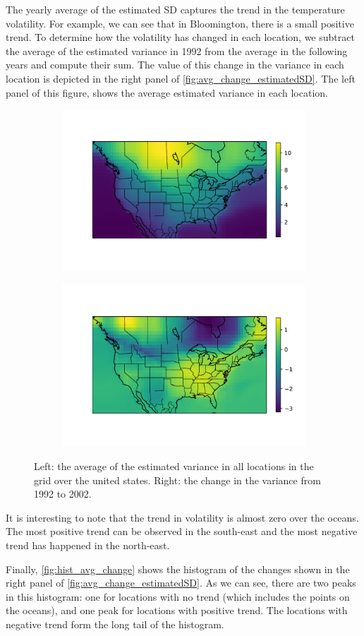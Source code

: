 \documentclass{article}
\begin{document}
The yearly average of the estimated SD captures the trend in the temperature volatility. For example, we can see that in Bloomington, there is a small positive trend. To determine how the volatility has changed in each location, we subtract the average of the estimated variance in 1992 from the average in the following years and compute their sum. The value of this change in the variance in each location is depicted in the right panel of \autoref{fig:avg_change_estimatedSD}. The left panel of this figure, shows the average estimated variance in each location.

\begin{figure}[ht]
	\begin{subfigure}
	  \centering
	  \includegraphics[width=.5\linewidth]{Figures/avg_estimatedVar}
	\end{subfigure}%
	\begin{subfigure}
	  \centering
	  \includegraphics[width=.5\linewidth]{Figures/avg_change_estimatedVar}
	\end{subfigure}%
	\caption{Left: the average of the estimated variance in all locations in the grid over the united states. Right: the change in the variance from 1992 to 2002.}
	\label{fig:avg_change_estimatedSD}
\end{figure} 

It is interesting to note that the trend in volatility is almost zero over the oceans. The most positive trend can be observed in the south-east and the most negative trend has happened in the north-east. 

Finally, \autoref{fig:hist_avg_change} shows the histogram of the changes shown in the right panel of \autoref{fig:avg_change_estimatedSD}. As we can see, there are two peaks in this histogram: one for locations with no trend (which includes the points on the oceans), and one peak for locations with positive trend. The locations with negative trend form the long tail of the histogram.
\end{document}

